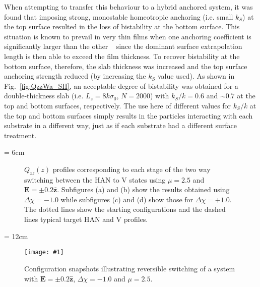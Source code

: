 \documentclass[aps,10pt,twocolumn]{revtex4}
\newcommand{\vect}[1]{ \mathbf{#1} }
\newcommand{\vecth}[1]{ \mathbf{\hat{#1} } }
\newlength{\picW}   %
\newcommand{\picA}{270} %
\newcommand{\pic}[1]{\texttt{[image: \#1]}}
\newcommand{\picL}[1]{\texttt{[image: \#1]}}
\begin{document}
When attempting to transfer this behaviour to a hybrid anchored system, it was found that imposing strong,
monostable homeotropic anchoring (i.e. small $k_S$) at the top surface resulted in the loss of bistability at the
bottom surface. This situation is known to prevail in very thin films when one anchoring coefficient is
significantly larger than the other ~\cite{Cleaver:2001.1,Sarlah} since the dominant surface extrapolation length
is then able to exceed the film thickness. To recover bistability at the bottom surface, therefore, the slab
thickness was increased and the top surface anchoring strength reduced (by increasing the $k_S$ value used). As
shown in Fig.~\ref{fig:QzzWa_SH}, an acceptable degree of bistability was obtained for a double-thickness slab
(i.e. $L_z=8k\sigma_0$, $N=2000$) with $k_{S}/k=0.6$ and $\sim 0.7$ at the top and bottom surfaces, respectively.
The use here of different values for $k_S/k$ at the top and bottom surfaces simply results in the particles
interacting with each substrate in a different way, just as if each substrate had a different surface treatment.

\picW = 6cm
\begin{figure}
    \centering
    \subfigure[]{\picL{fig_03a.ps}}
    \subfigure[]{\picL{fig_03b.ps}}

    \subfigure[]{\picL{fig_03c.ps}}
    \subfigure[]{\picL{fig_03d.ps}}
    \caption{$Q_{zz}(z)$ profiles corresponding to each stage of the two way switching between
    the HAN to V states using $\mu=2.5$ and $\vect{E}=\pm0.2\vecth{z}$.
    Subfigures (a) and (b) show the results obtained using
    $\Delta\chi=-1.0$ while subfigures (c) and (d) show those for $\Delta\chi=+1.0$.
    The dotted lines show the starting configurations and the dashed lines
    typical target HAN and V profiles.}
    \label{fig:QzzSwitch}
\end{figure}
\picW = 12cm
\begin{figure}
    \centering
    \pic{fig_04.ps}
    \caption{Configuration snapshots illustrating reversible switching of a system with
    $\vect{E}=\pm0.2\vecth{z}$, $\Delta\chi = -1.0$
    and $\mu = 2.5$.}
    \label{fig:fullSwitchSnaps}
\end{figure}
\end{document}
